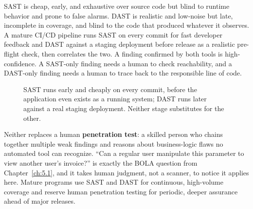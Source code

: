 \begin{example}
SAST is cheap, early, and exhaustive over source code but blind to runtime behavior and prone to
false alarms. DAST is realistic and low-noise but late, incomplete in coverage, and blind to the
code that produced whatever it observes. A mature CI/CD pipeline runs SAST on every commit for fast
developer feedback and DAST against a staging deployment before release as a realistic pre-flight
check, then correlates the two. A finding confirmed by both tools is high-confidence. A SAST-only
finding needs a human to check reachability, and a DAST-only finding needs a human to trace back to
the responsible line of code.
\end{example}

\begin{figure}[h]
\centering
{}
\caption{SAST runs early and cheaply on every commit, before the application even exists as a
running system; DAST runs later against a real staging deployment. Neither stage substitutes for
the other.}
\label{fig:5.5-sast-dast}
\end{figure}

Neither replaces a human \textbf{penetration test}: a skilled person who chains together multiple
weak findings and reasons about business-logic flaws no automated tool can recognize. ``Can a
regular user manipulate this parameter to view another user's invoice?'' is exactly the BOLA
question from Chapter~\ref{ch:5.1}, and it takes human judgment, not a scanner, to notice it applies
here. Mature programs use SAST and DAST for continuous, high-volume coverage and reserve human
penetration testing for periodic, deeper assurance ahead of major releases.

